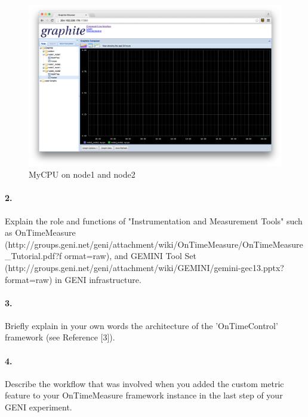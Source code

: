 \documentclass[a4paper]{article}
\begin{document}
\begin{figure}[H]
  \centering
    \includegraphics[scale=.32]{mycpu.png}
  \caption{MyCPU on node1 and node2}
\end{figure}

\paragraph{2. } Explain the role and functions of "Instrumentation and Measurement Tools" such as OnTimeMeasure (http://groups.geni.net/geni/attachment/wiki/OnTimeMeasure/OnTimeMeasure\_Tutorial.pdf?f ormat=raw), and GEMINI Tool Set (http://groups.geni.net/geni/attachment/wiki/GEMINI/gemini-gec13.pptx?format=raw) in GENI infrastructure.

\paragraph{3. } Briefly explain in your own words the architecture of the 'OnTimeControl' framework (see Reference [3]).

\paragraph{4. } Describe the workflow that was involved when you added the custom metric feature to your OnTimeMeasure framework instance in the last step of your GENI experiment.
\end{document}
